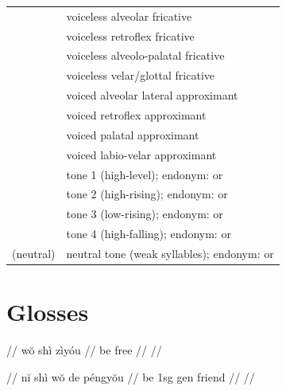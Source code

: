 \documentclass{article}
\begin{document}
\begin{xltabular}{\textwidth}{lL}
   & voiceless alveolar fricative \\
   & voiceless retroflex fricative \\
  \ipa{\textctc} & voiceless alveolo-palatal fricative \\
   & voiceless velar/glottal fricative \\
   & voiced alveolar lateral approximant \\
   & voiced retroflex approximant \\
   & voiced palatal approximant \\
   & voiced labio-velar approximant \\
   & tone 1 (high-level); endonym:  or  \\
   & tone 2 (high-rising); endonym:  or  \\
   & tone 3 (low-rising); endonym:  or  \\
   & tone 4 (high-falling); endonym:  or  \\
  (neutral) & neutral tone (weak syllables); endonym:  or  \\
\end{xltabular}

\newpage\section{Glosses}

\ex
\begingl
\gla {}   //
\glb w\u{o} sh\`{i} z\`{i}y\'{o}u //
 be free //
 //
\endgl
\xe

\ex
\begingl
\gla {}     //
\glb n\u{i} sh\`{i} w\u{o} de p\'{e}ngy\u{o}u //
 be {\sc 1sg} {\sc gen} friend //
 //
\endgl
\xe
\end{document}
